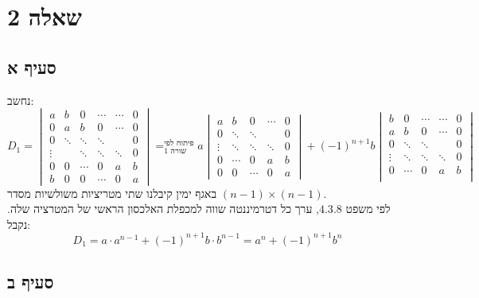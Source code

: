 \documentclass{article}
\DeclareMathOperator*{\equals}{=}
\begin{document}
\section*{שאלה 2}

\subsection*{סעיף א}
נחשב:
\[
    D_1 =
    \begin{vmatrix}
        a      & b      & 0      & \cdots & \cdots & 0 \\
        0      & a      & b      & 0      & \cdots & 0 \\
        0      & \ddots & \ddots & \ddots &        & 0 \\
        \vdots &        & \ddots & \ddots & \ddots & 0 \\
        0      & 0      & \cdots & 0      & a      & b \\
        b      & 0      & 0      & \cdots & 0      & a
    \end{vmatrix}
    \equals^\text{פיתוח לפי}_\text{שורה 1}
    a \begin{vmatrix}
        a      & b      & 0      & \cdots & 0 \\
        0      & \ddots & \ddots &        & 0 \\
        \vdots & \ddots & \ddots & \ddots & 0 \\
        0      & \cdots & 0      & a      & b \\
        0      & 0      & \cdots & 0      & a
    \end{vmatrix}
    + (-1)^{n+1}b \begin{vmatrix}
        b      & 0      & \cdots & \cdots & 0 \\
        a      & b      & 0      & \cdots & 0 \\
        0      & \ddots & \ddots &        & 0 \\
        \vdots & \ddots & \ddots & \ddots & 0 \\
        0      & \cdots & 0      & a      & b \\
    \end{vmatrix}
\]
באגף ימין קיבלנו שתי מטריציות משולשיות מסדר $(n-1)\times(n-1)$. \\
לפי משפט $4.3.8$, ערך כל דטרמיננטה שווה למכפלת האלכסון הראשי של המטרציה שלה.
נקבל:
\[
    D_1 = a \cdot a^{n-1} + (-1)^{n+1}b \cdot b^{n-1} =
    a^n  + (-1)^{n+1}b^n
\]

\subsection*{סעיף ב}
\end{document}
